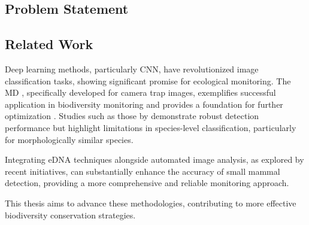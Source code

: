 \subsection{Problem Statement}


\subsection{Related Work}

Deep learning methods, particularly \ac{CNN}, have revolutionized image classification tasks, showing significant promise for ecological monitoring.
The \ac{MD} \autocite{morrisEfficientPipelineCamera2025}, specifically developed for camera trap images, exemplifies successful application in biodiversity monitoring and provides a foundation for further optimization \autocite{hernandezPytorchWildlifeCollaborativeDeep2024, velezChoosingAppropriatePlatform2022, schneiderRecognitionEuropeanMammals2024}.
Studies such as those by \textcite{velezChoosingAppropriatePlatform2022,schneiderRecognitionEuropeanMammals2024} demonstrate robust detection performance but highlight limitations in species-level classification, particularly for morphologically similar species.

Integrating \ac{eDNA} techniques alongside automated image analysis, as explored by recent initiatives, can substantially enhance the accuracy of small mammal detection, providing a more comprehensive and reliable monitoring approach.

This thesis aims to advance these methodologies, contributing to more effective biodiversity conservation strategies.
